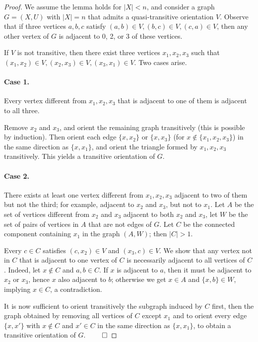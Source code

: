 \documentclass[runningheads]{llncs}
\begin{document}
\begin{proof}
We assume the lemma holds for $|X| < n$, and consider a graph $G = (X,U)$ with $|X| = n$ that admits a quasi-transitive orientation $V$. Observe that if three vertices $a,b,c$ satisfy $(a,b) \in V, (b,c) \in V, (c,a) \in V$, then any other vertex of $G$ is adjacent to 0, 2, or 3 of these vertices.

If $V$ is not transitive, then there exist three vertices $x_1, x_2, x_3$ such that $(x_1,x_2) \in V,(x_2,x_3) \in V,(x_3,x_1) \in V$. Two cases arise.

\paragraph{Case 1.}
Every vertex different from $x_1,x_2,x_3$ that is adjacent to one of them is adjacent to all three.

Remove $x_2$ and $x_3$, and orient the remaining graph transitively (this is possible by induction). Then orient each edge $\{x,x_2\}$ or $\{x,x_3\}$ (for $x \notin \{x_1,x_2,x_3\}$) in the same direction as $\{x,x_1\}$, and orient the triangle formed by $x_1,x_2,x_3$ transitively. This yields a transitive orientation of $G$.

\paragraph{Case 2.}
There exists at least one vertex different from $x_1,x_2,x_3$ adjacent to two of them but not the third; for example, adjacent to $x_2$ and $x_3$, but not to $x_1$. Let $A$ be the set of vertices different from $x_2$ and $x_3$ adjacent to both $x_2$ and $x_3$, let $W$ be the set of pairs of vertices in $A$ that are not edges of $G$. Let $C$ be the connected component containing $x_1$ in the graph $(A,W)$; then $|C| > 1$.

Every $c \in C$ satisfies $(c,x_2) \in V $ and $(x_3,c) \in V$. We show that any vertex not in $C$ that is adjacent to one vertex of $C$ is necessarily adjacent to all vertices of $C$. Indeed, let $x \notin C$ and $a,b \in C$. If $x$ is adjacent to $a$, then it must be adjacent to $x_2$ or $x_3$, hence $x$ also adjacent to $b$; otherwise we get $x \in A$ and $\{x,b\} \in W$, implying $x \in C$, a contradiction.

It is now sufficient to orient transitively the subgraph induced by $C$ first, then the graph obtained by removing all vertices of $C$ except $x_1$ and to orient every edge $\{x,x'\}$ with $x \notin C$ and $x' \in C$ in the same direction as $\{x,x_1\}$, to obtain a transitive orientation of $G$.
$\qed$\end{proof}
\end{document}
